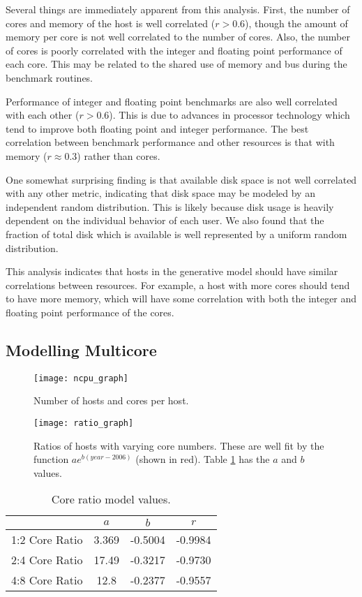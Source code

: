\documentclass[conference]{IEEEtran}
\begin{document}
Several things are immediately apparent from this analysis.  First, the number of cores and memory of the host is well correlated ($r > 0.6$), though the amount of memory per core is not well correlated to the number of cores.  Also, the number of cores is poorly correlated with the integer and floating point performance of each core.  This may be related to the shared use of memory and bus during the benchmark routines.

Performance of integer and floating point benchmarks are also well correlated with each other ($r > 0.6$).  This is due to advances in processor technology which tend to improve both floating point and integer performance.  The best correlation between benchmark performance and other resources is that with memory ($r \approx 0.3$) rather than cores.

One somewhat surprising finding is that available disk space is not well correlated with any other metric, indicating that disk space may be modeled by an independent random distribution.  This is likely because disk usage is heavily dependent on the individual behavior of each user.  We also found that the fraction of total disk which is available is well represented by a uniform random distribution.

This analysis indicates that hosts in the generative model should have similar correlations between resources.  For example, a host with more cores should tend to have more memory, which will have some correlation with both the integer and floating point performance of the cores.

\subsection{Modelling Multicore}
\label{sec-model-core}

\begin{figure}[!t]
\centering
\texttt{[image: ncpu\_graph]}
\caption{Number of hosts and cores per host.}
\label{fig-ncpu-graph}
\end{figure}

\begin{figure}[!t]
\centering
\texttt{[image: ratio\_graph]}
\caption{Ratios of hosts with varying core numbers.  These are well fit by the function $a e^{b (year-2006)}$ (shown in red). Table \ref{core-ratio-val-table} has the $a$ and $b$ values.}
\label{fig-ratio-graph}
\end{figure}

\begin{table}
\caption{Core ratio model values.}
\centering
\begin{tabular}{|c|c|c|c|}
\hline
& $a$ & $b$ & $r$ \\
\hline
1:2 Core Ratio & 3.369 & -0.5004 & -0.9984 \\
\hline
2:4 Core Ratio & 17.49 & -0.3217 & -0.9730 \\
\hline
4:8 Core Ratio & 12.8 & -0.2377 & -0.9557 \\
\hline
\end{tabular}
\label{core-ratio-val-table}
\end{table}
\end{document}
